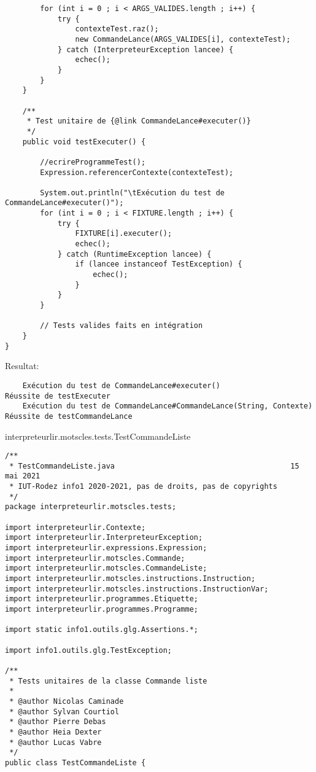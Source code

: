 \begin{enum}
\begin{verbatim}
        for (int i = 0 ; i < ARGS_VALIDES.length ; i++) {
            try {
                contexteTest.raz();
                new CommandeLance(ARGS_VALIDES[i], contexteTest);
            } catch (InterpreteurException lancee) {
                echec();
            }
        }
    }
    
    /**
     * Test unitaire de {@link CommandeLance#executer()}
     */
    public void testExecuter() {
        
        //ecrireProgrammeTest();
        Expression.referencerContexte(contexteTest);
        
        System.out.println("\tExécution du test de CommandeLance#executer()");
        for (int i = 0 ; i < FIXTURE.length ; i++) {
            try {
                FIXTURE[i].executer();
                echec();
            } catch (RuntimeException lancee) {
                if (lancee instanceof TestException) {
                    echec();
                }
            }
        }
        
        // Tests valides faits en intégration
    }
}
\end{verbatim}
Resultat:
\begin{verbatim}
    Exécution du test de CommandeLance#executer()
Réussite de testExecuter
    Exécution du test de CommandeLance#CommandeLance(String, Contexte)
Réussite de testCommandeLance
\end{verbatim}

    \item interpreteurlir.motscles.tests.TestCommandeListe
\begin{verbatim}
/**
 * TestCommandeListe.java                                        15 mai 2021
 * IUT-Rodez info1 2020-2021, pas de droits, pas de copyrights
 */
package interpreteurlir.motscles.tests;

import interpreteurlir.Contexte;
import interpreteurlir.InterpreteurException;
import interpreteurlir.expressions.Expression;
import interpreteurlir.motscles.Commande;
import interpreteurlir.motscles.CommandeListe;
import interpreteurlir.motscles.instructions.Instruction;
import interpreteurlir.motscles.instructions.InstructionVar;
import interpreteurlir.programmes.Etiquette;
import interpreteurlir.programmes.Programme;

import static info1.outils.glg.Assertions.*;

import info1.outils.glg.TestException;

/** 
 * Tests unitaires de la classe Commande liste
 * 
 * @author Nicolas Caminade
 * @author Sylvan Courtiol
 * @author Pierre Debas
 * @author Heia Dexter
 * @author Lucas Vabre
 */
public class TestCommandeListe {


\end{verbatim}
\end{enum}

